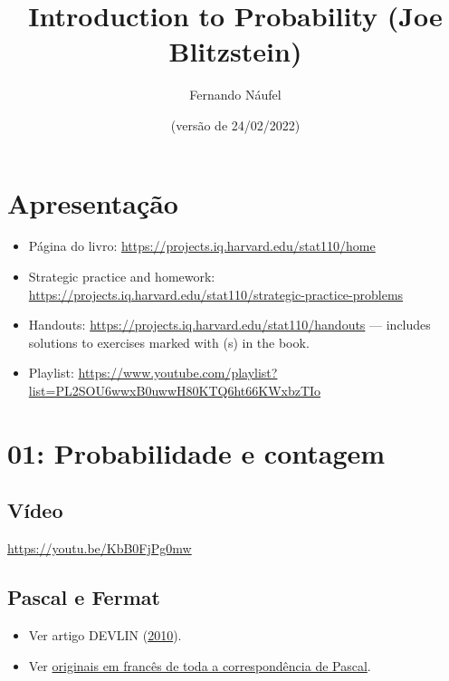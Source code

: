 \documentclass[
  11pt]{report}
\title{Introduction to Probability (Joe Blitzstein)}
\author{Fernando Náufel}
\date{(versão de 24/02/2022)}
\begin{document}
\maketitle

{
\setcounter{tocdepth}{1}
\tableofcontents
}
\hypertarget{apresentauxe7uxe3o}{%
\chapter*{Apresentação}\label{apresentauxe7uxe3o}}

\begin{itemize}
\item
  Página do livro: \url{https://projects.iq.harvard.edu/stat110/home}
\item
  Strategic practice and homework: \url{https://projects.iq.harvard.edu/stat110/strategic-practice-problems}
\item
  Handouts: \url{https://projects.iq.harvard.edu/stat110/handouts} --- includes solutions to exercises marked with (s) in the book.
\item
  Playlist: \url{https://www.youtube.com/playlist?list=PL2SOU6wwxB0uwwH80KTQ6ht66KWxbzTIo}
\end{itemize}

\hypertarget{probabilidade-e-contagem}{%
\chapter*{01: Probabilidade e contagem}\label{probabilidade-e-contagem}}

\hypertarget{vuxeddeo}{%
\section*{Vídeo}\label{vuxeddeo}}

\begin{center} \url{https://youtu.be/KbB0FjPg0mw} \end{center}

\hypertarget{pascal-e-fermat}{%
\section*{Pascal e Fermat}\label{pascal-e-fermat}}

\begin{itemize}
\item
  Ver artigo DEVLIN (\protect\hyperlink{ref-devlin-2010-pascal-fermat}{2010}).
\item
  Ver \href{https://gallica.bnf.fr/ark:/12148/bpt6k69975r.image.r=Blaise+Pascal.f233.langFR}{originais em francês de toda a correspondência de Pascal}.
\end{itemize}
\end{document}
